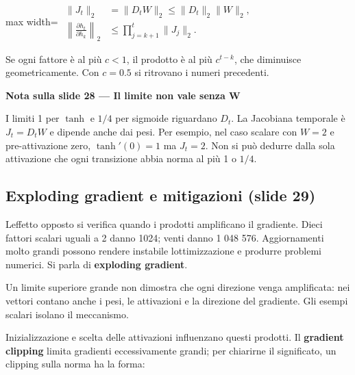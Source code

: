 \documentclass[11pt,a4paper,oneside,openany]{book}
\renewenvironment{quote}{\list{}{\leftmargin=1em\rightmargin=0pt}\item\relax}{\endlist}
\begin{document}
\begin{center}
\begin{adjustbox}{max width=\linewidth}
$\displaystyle 
\begin{aligned}
\|J_t\|_2&=\|D_tW\|_2\leq\|D_t\|_2\|W\|_2,\\
\left\|\frac{\partial h_t}{\partial h_k}\right\|_2
&\leq\prod_{j=k+1}^{t}\|J_j\|_2.
\end{aligned}
$
\end{adjustbox}
\end{center}

Se ogni fattore è al più \(c<1\), il prodotto è al più \(c^{t-k}\), che diminuisce geometricamente. Con \(c=0.5\) si ritrovano i numeri precedenti.

\begin{quote}
\textbf{Nota sulla slide 28 --- Il limite non vale senza W}
\end{quote}

\begin{quote}
I limiti 1 per \(\tanh\) e \(1/4\) per sigmoide riguardano \(D_t\). La Jacobiana temporale è \(J_t=D_tW\) e dipende anche dai pesi. Per esempio, nel caso scalare con \(W=2\) e pre-attivazione zero, \(\tanh'(0)=1\) ma \(J_t=2\). Non si può dedurre dalla sola attivazione che ogni transizione abbia norma al più 1 o \(1/4\).
\end{quote}

\subsection{Exploding gradient e mitigazioni (slide 29)}\label{f03-r619}

L\textquotesingle effetto opposto si verifica quando i prodotti amplificano il gradiente. Dieci fattori scalari uguali a 2 danno 1024; venti danno 1 048 576. Aggiornamenti molto grandi possono rendere instabile l\textquotesingle ottimizzazione e produrre problemi numerici. Si parla di \textbf{exploding gradient}.

Un limite superiore grande non dimostra che ogni direzione venga amplificata: nei vettori contano anche i pesi, le attivazioni e la direzione del gradiente. Gli esempi scalari isolano il meccanismo.

Inizializzazione e scelta delle attivazioni influenzano questi prodotti. Il \textbf{gradient clipping} limita gradienti eccessivamente grandi; per chiarirne il significato, un clipping sulla norma ha la forma:
\end{document}
